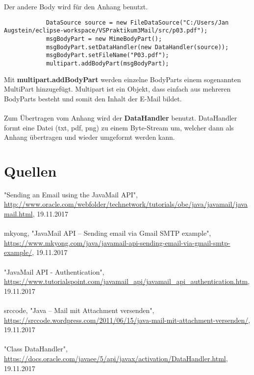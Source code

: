 Der andere Body wird für den Anhang benutzt.
\begin{lstlisting}
			DataSource source = new FileDataSource("C:/Users/Jan Augstein/eclipse-workspace/VSPraktikum3Mail/src/p03.pdf");
			msgBodyPart = new MimeBodyPart();
			msgBodyPart.setDataHandler(new DataHandler(source));
			msgBodyPart.setFileName("P03.pdf");
			multipart.addBodyPart(msgBodyPart);
\end{lstlisting}

Mit \textbf{multipart.addBodyPart} werden einzelne BodyParts einem sogenannten MultiPart hinzugefügt. Multipart ist ein Objekt, dass einfach aus mehreren BodyParts besteht und somit den Inhalt der E-Mail bildet. \\
\\
Zum Übertragen vom Anhang wird der \textbf{DataHandler} benutzt. DataHandler formt eine Datei (txt, pdf, png) zu einem Byte-Stream um, welcher dann als Anhang übertragen und wieder umgeformt werden kann. \\

\section{Quellen}
"Sending an Email using the JavaMail API", \href{http://www.oracle.com/webfolder/technetwork/tutorials/obe/java/javamail/javamail.html}{http://www.oracle.com/webfolder/technetwork/tutorials/obe/java/javamail/javamail.html}, 19.11.2017 \\
\\
mkyong, "JavaMail API – Sending email via Gmail SMTP example", \href{https://www.mkyong.com/java/javamail-api-sending-email-via-gmail-smtp-example/}{https://www.mkyong.com/java/javamail-api-sending-email-via-gmail-smtp-example/}, 19.11.2017 \\
\\
"JavaMail API - Authentication", \href{https://www.tutorialspoint.com/javamail\_api/javamail\_api\_authentication.htm}{https://www.tutorialspoint.com/javamail\_api/javamail\_api\_authentication.htm}, 19.11.2017 \\
\\
srccode, "Java – Mail mit Attachment versenden", \href{https://srccode.wordpress.com/2011/06/15/java-mail-mit-attachment-versenden/}{https://srccode.wordpress.com/2011/06/15/java-mail-mit-attachment-versenden/}, 19.11.2017 \\
\\
"Class DataHandler", \href{https://docs.oracle.com/javaee/5/api/javax/activation/DataHandler.html}{https://docs.oracle.com/javaee/5/api/javax/activation/DataHandler.html}, 19.11.2017






 
